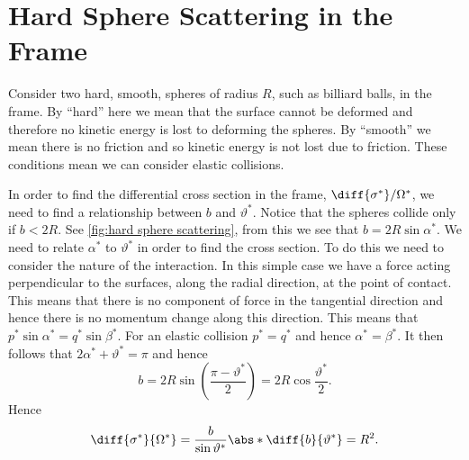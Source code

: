     \section{Hard Sphere Scattering in the \protect\CM{} Frame}
    Consider two hard, smooth, spheres of radius \(R\), such as billiard balls, in the \CM{} frame.
    By \enquote{hard} here we mean that the surface cannot be deformed and therefore no kinetic energy is lost to deforming the spheres.
    By \enquote{smooth} we mean there is no friction and so kinetic energy is not lost due to friction.
    These conditions mean we can consider elastic collisions.
    
    In order to find the differential cross section in the \CM{} frame, \(\diff{\sigma^*}/{\Omega^*}\), we need to find a relationship between \(b\) and \(\vartheta^*\).
    Notice that the spheres collide only if \(b < 2R\).
    See \cref{fig:hard sphere scattering}, from this we see that \(b = 2R\sin\alpha^*\).
    We need to relate \(\alpha^*\) to \(\vartheta^*\) in order to find the cross section.
    To do this we need to consider the nature of the interaction.
    In this simple case we have a force acting perpendicular to the surfaces, along the radial direction, at the point of contact.
    This means that there is no component of force in the tangential direction and hence there is no momentum change along this direction.
    This means that \(p^*\sin\alpha^* = q^*\sin\beta^*\).
    For an elastic collision \(p^* = q^*\) and hence \(\alpha^* = \beta^*\).
    It then follows that \(2\alpha^* + \vartheta^* = \pi\) and hence
    \begin{equation}
        b = 2R\sin\left( \frac{\pi - \vartheta^*}{2} \right) = 2R\cos\frac{\vartheta^*}{2}.
    \end{equation}
    Hence
    \begin{equation}
        \diff{\sigma^*}{\Omega^*} = \frac{b}{\sin\vartheta^*} \abs*{\diff{b}{\vartheta^*}} = R^2.
    \end{equation}
    
